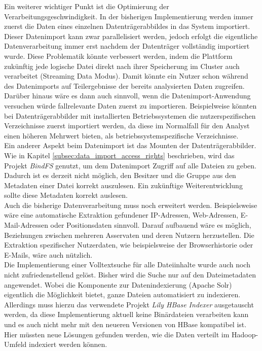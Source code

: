 \noindent
Ein weiterer wichtiger Punkt ist die Optimierung der Verarbeitungsgeschwindigkeit. In der bisherigen Implementierung werden immer zuerst die Daten eines einzelnen Datenträgerabbildes in das System importiert. Dieser Datenimport kann zwar parallelisiert werden, jedoch erfolgt die eigentliche Datenverarbeitung immer erst nachdem der Datenträger vollständig importiert wurde. Diese Problematik könnte verbessert werden, indem die Plattform zukünftig jede logische Datei direkt nach ihrer Speicherung im Cluster auch verarbeitet (Streaming Data Modus). Damit könnte ein Nutzer schon während des Datenimports auf Teilergebnisse der bereits analysierten Daten zugreifen. Darüber hinaus wäre es dann auch sinnvoll, wenn die Datenimport-Anwendung versuchen würde fallrelevante Daten zuerst zu importieren. Beispielweise könnten bei Datenträgerabbilder mit installierten Betriebssystemen die nutzerspezifischen Verzeichnisse zuerst importiert werden, da diese im Normalfall für den Analyst einen höheren Mehrwert bieten, als betriebssystemspezifische Verzeichnisse.\\
Ein anderer Aspekt beim Datenimport ist das Mounten der Datenträgerabbilder. Wie in Kapitel \ref{subsec:data_import_access_rights} beschrieben, wird das Projekt \textit{BindFS} genutzt, um dem Datenimport Zugriff auf alle Dateien zu geben. Dadurch ist es derzeit nicht möglich, den Besitzer und die Gruppe aus den Metadaten einer Datei korrekt auszulesen. Ein zukünftige Weiterentwicklung sollte diese Metadaten korrekt auslesen.\\

\noindent
Auch die bisherige Datenverarbeitung muss noch erweitert werden. Beispielsweise wäre eine automatische Extraktion gefundener IP-Adressen, Web-Adressen, E-Mail-Adressen oder Positionsdaten sinnvoll. Darauf aufbauend wäre es möglich, Beziehungen zwischen mehreren Asservaten und deren Nutzern herzustellen. Die Extraktion spezifischer Nutzerdaten, wie beispielsweise der Browserhistorie oder E-Mails, wäre auch nützlich.\\

\noindent
Die Implementierung einer Volltextsuche für alle Dateiinhalte wurde auch noch nicht zufriedenstellend gelöst. Bisher wird die Suche nur auf den Dateimetadaten angewendet. Wobei die Komponente zur Datenindexierung (Apache Solr) eigentlich die Möglichkeit bietet, ganze Dateien automatisiert zu indexieren. Allerdings muss hierzu das verwendete Projekt \textit{Lily HBase Indexer} ausgetauscht werden, da diese Implementierung aktuell keine Binärdateien verarbeiten kann und es auch nicht mehr mit den neueren Versionen von HBase kompatibel ist. Hier müssten neue Lösungen gefunden werden, wie die Daten verteilt im Hadoop-Umfeld indexiert werden können.\\

